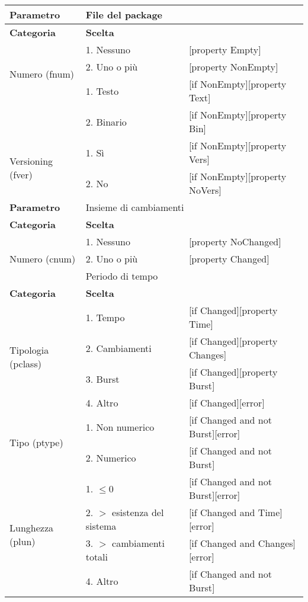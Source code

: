 \begin{tabular}{|p{4cm}|p{4cm}p{5cm}|}
	\hline
	\cellcolor{Gray} \textbf{Parametro}				& \multicolumn{2}{l|}{File del package}							\tabularnewline
	\hline
	\rowcolor{Gray}
	\textbf{Categoria}						& \textbf{Scelta}			&						\tabularnewline
	\hline
	\multirow{3}{*}{Numero (fnum)}					& 1. Nessuno				&	[property Empty] 			\tabularnewline
									\cline{2-3}
									& 2. Uno o più				&	[property NonEmpty]			\tabularnewline
	\hline
	\multirow{2}{*}{Tipo (ftype)}					& 1. Testo				&	[if NonEmpty][property Text] 		\tabularnewline
									\cline{2-3}
									& 2. Binario				&	[if NonEmpty][property Bin]		\tabularnewline
	\hline
	\multirow{2}{*}{Versioning (fver)}				& 1. Sì					&	[if NonEmpty][property Vers] 		\tabularnewline
									\cline{2-3}
									& 2. No					&	[if NonEmpty][property NoVers]		\tabularnewline
	\hline
	
	\cellcolor{Gray} \textbf{Parametro}				& \multicolumn{2}{l|}{Insieme di cambiamenti}						\tabularnewline
	\hline
	\rowcolor{Gray}
	\textbf{Categoria}						& \textbf{Scelta}			&						\tabularnewline
	\hline
	\multirow{3}{*}{Numero (cnum)}					& 1. Nessuno				&	[property NoChanged] 			\tabularnewline
									\cline{2-3}
									& 2. Uno o più				&	[property Changed]			\tabularnewline
	\hline
	
	\cellcolor{Gray} \textbf{Parametro}				& \multicolumn{2}{l|}{Periodo di tempo}							\tabularnewline
	\hline
	\rowcolor{Gray}
	\textbf{Categoria}						& \textbf{Scelta}			&						\tabularnewline
	\hline
	\multirow{4}{*}{Tipologia (pclass)}				& 1. Tempo				&	[if Changed][property Time] 		\tabularnewline
									\cline{2-3}
									& 2. Cambiamenti			&	[if Changed][property Changes]		\tabularnewline
									\cline{2-3}
									& 3. Burst				&	[if Changed][property Burst]		\tabularnewline
									\cline{2-3}
									& 4. Altro				&	[if Changed][error]			\tabularnewline
	\hline
	\multirow{2}{*}{Tipo (ptype)}					& 1. Non numerico			&	[if Changed and not Burst][error] 	\tabularnewline
									\cline{2-3}
									& 2. Numerico				&	[if Changed and not Burst]		\tabularnewline
	\hline
	\multirow{4}{*}{Lunghezza (plun)}				& 1. $\leq 0$				&	[if Changed and not Burst][error]	\tabularnewline
									\cline{2-3}
									& 2. $>$ esistenza del sistema		&	[if Changed and Time][error]		\tabularnewline
									\cline{2-3}
									& 3. $>$ cambiamenti totali		&	[if Changed and Changes][error]		\tabularnewline
									\cline{2-3}
									& 4. Altro				&	[if Changed and not Burst]		\tabularnewline
	\hline
\end{tabular}

